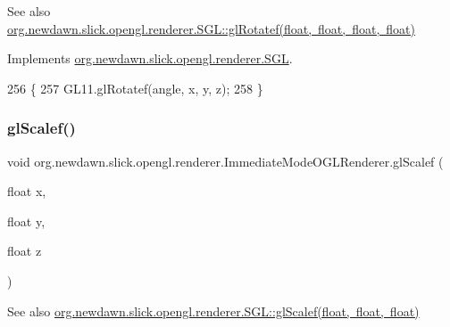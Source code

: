 \begin{DoxySeeAlso}{See also}
\mbox{\hyperlink{interfaceorg_1_1newdawn_1_1slick_1_1opengl_1_1renderer_1_1_s_g_l_ac5675bd1b391998a8bf63d5d87a04347}{org.\+newdawn.\+slick.\+opengl.\+renderer.\+S\+G\+L\+::gl\+Rotatef(float, float, float, float)}} 
\end{DoxySeeAlso}


Implements \mbox{\hyperlink{interfaceorg_1_1newdawn_1_1slick_1_1opengl_1_1renderer_1_1_s_g_l_ac5675bd1b391998a8bf63d5d87a04347}{org.\+newdawn.\+slick.\+opengl.\+renderer.\+S\+GL}}.


\begin{DoxyCode}
256                                                                   \{
257         GL11.glRotatef(angle, x, y, z);
258     \}
\end{DoxyCode}
\mbox{\label{classorg_1_1newdawn_1_1slick_1_1opengl_1_1renderer_1_1_immediate_mode_o_g_l_renderer_ae2a00de1d4a29e658ca63685b1870413}} 
\subsubsection{\texorpdfstring{gl\+Scalef()}{glScalef()}}
{\footnotesize\ttfamily void org.\+newdawn.\+slick.\+opengl.\+renderer.\+Immediate\+Mode\+O\+G\+L\+Renderer.\+gl\+Scalef (\begin{DoxyParamCaption}\item[{float}]{x,  }\item[{float}]{y,  }\item[{float}]{z }\end{DoxyParamCaption})\hspace{0.3cm}{\ttfamily [inline]}}

\begin{DoxySeeAlso}{See also}
\mbox{\hyperlink{interfaceorg_1_1newdawn_1_1slick_1_1opengl_1_1renderer_1_1_s_g_l_a3af948fb9b1074143a0ce384a2035d02}{org.\+newdawn.\+slick.\+opengl.\+renderer.\+S\+G\+L\+::gl\+Scalef(float, float, float)}} 
\end{DoxySeeAlso}



